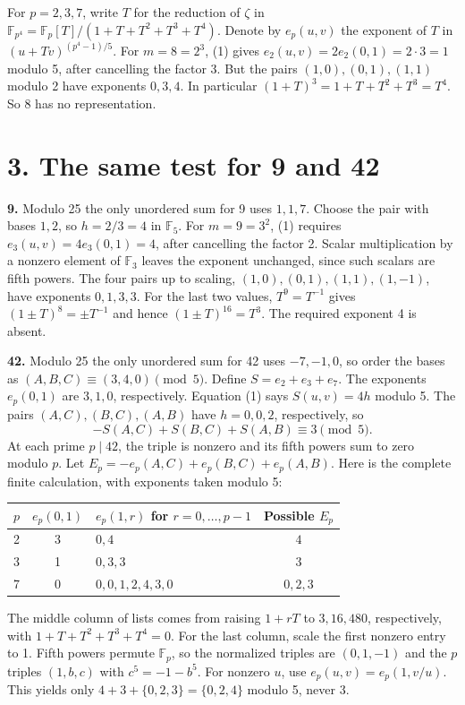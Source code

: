 \documentclass[10pt]{article}
\newcommand{\F}{\mathbb F}
\begin{document}
For $p=2,3,7$, write $T$ for the reduction of $\zeta$ in
$\F_{p^4}=\F_p[T]/(1+T+T^2+T^3+T^4)$. Denote by $e_p(u,v)$ the exponent
of $T$ in $(u+Tv)^{(p^4-1)/5}$. For $m=8=2^3$, (1) gives
$e_2(u,v)=2e_2(0,1)=2\cdot3=1$ modulo 5, after cancelling the factor 3.
But the pairs $(1,0),(0,1),(1,1)$ modulo 2 have exponents $0,3,4$.
In particular $(1+T)^3=1+T+T^2+T^3=T^4$. So 8 has no representation.

\clearpage
\section*{3. The same test for 9 and 42}
\textbf{9.} Modulo 25 the only unordered sum for 9 uses $1,1,7$. Choose
the pair with bases $1,2$, so $h=2/3=4$ in $\F_5$. For $m=9=3^2$,
(1) requires $e_3(u,v)=4e_3(0,1)=4$, after cancelling the factor 2.
Scalar multiplication by a nonzero element of $\F_3$ leaves the exponent
unchanged, since such scalars are fifth powers. The four pairs up to
scaling, $(1,0),(0,1),(1,1),(1,-1)$, have exponents $0,1,3,3$.
For the last two values, $T^9=T^{-1}$ gives
$(1\pm T)^8=\pm T^{-1}$ and hence $(1\pm T)^{16}=T^3$.
The required exponent 4 is absent.

\textbf{42.} Modulo 25 the only unordered sum for 42 uses $-7,-1,0$,
so order the bases as $(A,B,C)\equiv(3,4,0)\pmod5$.
Define $S=e_2+e_3+e_7$. The exponents $e_p(0,1)$ are $3,1,0$,
respectively. Equation (1) says $S(u,v)=4h$ modulo 5. The pairs
$(A,C),(B,C),(A,B)$ have $h=0,0,2$, respectively, so
\[
  -S(A,C)+S(B,C)+S(A,B)\equiv3\pmod5.
\]
At each prime $p\mid42$, the triple is nonzero and its fifth powers sum
to zero modulo $p$. Let $E_p=-e_p(A,C)+e_p(B,C)+e_p(A,B)$.
Here is the complete finite calculation, with exponents taken modulo 5:
\begin{center}
\begin{tabular}{@{}cclc@{}}
\toprule
$p$ & $e_p(0,1)$ & $e_p(1,r)$ for $r=0,\ldots,p-1$ & Possible $E_p$\\
\midrule
2 & 3 & $0,4$ & $4$\\
3 & 1 & $0,3,3$ & $3$\\
7 & 0 & $0,0,1,2,4,3,0$ & $0,2,3$\\
\bottomrule
\end{tabular}
\end{center}
The middle column of lists comes from raising $1+rT$ to $3,16,480$,
respectively, with $1+T+T^2+T^3+T^4=0$. For the last column, scale
the first nonzero entry to 1. Fifth powers permute $\F_p$, so the
normalized triples are $(0,1,-1)$ and the $p$ triples $(1,b,c)$ with
$c^5=-1-b^5$. For nonzero $u$, use $e_p(u,v)=e_p(1,v/u)$.
This yields only $4+3+\{0,2,3\}=\{0,2,4\}$ modulo 5, never 3.
\end{document}
